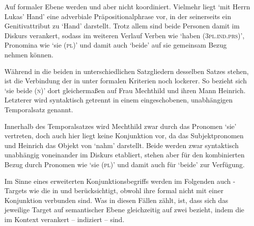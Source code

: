 Auf formaler Ebene werden  und  aber nicht koordiniert.
Vielmehr liegt  `mit Herrn Lukas' Hand' eine
adverbiale Präpositionalphrase vor, in der 
seinerseits ein Genitivattribut zu  `Hand' darstellt.
Trotz allem sind beide Personen damit im Diskurs verankert,
sodass im weiteren Verlauf Verben wie  `haben
(\textsc{3pl.ind.prs})', Pronomina wie  `sie (\textsc{pl})' und damit
auch  `beide' auf sie gemeinsam Bezug nehmen können.

Während in  die beiden  in
unterschiedlichen Satzgliedern desselben Satzes stehen, ist die Verbindung der
 in  unter formalen Kriterien noch
lockerer. So bezieht sich  `sie beide (\textsc{n})' dort
gleichermaßen auf Frau Mechthild und ihren Mann Heinrich. Letzterer wird
syntaktisch getrennt in einem eingeschobenen, unabhängigen Temporalsatz
genannt.


Innerhalb des Temporalsatzes wird Mechthild zwar durch das Pronomen 
`sie' vertreten, doch auch hier liegt keine Konjunktion vor, da  das
Subjektpronomen und Heinrich das Objekt von  `nahm' darstellt. Beide
 werden zwar syntaktisch unabhängig voneinander im Diskurs
etabliert, stehen aber für den kombinierten Bezug durch Pronomen wie
 `sie (\textsc{pl})' und damit auch für 
`beide' zur Verfügung.

Im Sinne eines erweiterten Konjunktionsbegriffs werden im Folgenden auch
-Targets wie die in  und
 berücksichtigt, obwohl ihre  formal
nicht mit einer Konjunktion verbunden sind. Was in diesen Fällen zählt, ist,
dass sich das jeweilige Target auf semantischer Ebene gleichzeitig auf zwei
 bezieht, indem die  im Kontext
verankert -- indiziert -- sind.
